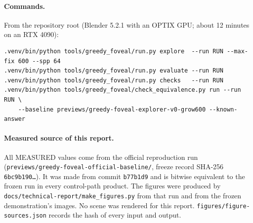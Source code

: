 \documentclass[11pt,a4paper]{article}
\newcommand{\code}[1]{\texttt{\small #1}}
\begin{document}
\paragraph{Commands.} From the repository root (Blender 5.2.1 with an OPTIX GPU; about 12 minutes on an RTX 4090):
{\footnotesize
\begin{verbatim}
.venv/bin/python tools/greedy_foveal/run.py explore  --run RUN --max-fix 600 --spp 64
.venv/bin/python tools/greedy_foveal/run.py evaluate --run RUN
.venv/bin/python tools/greedy_foveal/run.py checks   --run RUN
.venv/bin/python tools/greedy_foveal/check_equivalence.py run --run RUN \
    --baseline previews/greedy-foveal-explorer-v0-grow600 --known-answer
\end{verbatim}}

\paragraph{Measured source of this report.} All MEASURED values come from the official reproduction run
(\nolinkurl{previews/greedy-foveal-official-baseline/}, freeze record SHA-256 \code{6bc9b190\ldots}). It was made from
commit \code{b77b1d9} and is bitwise equivalent to the frozen run in every control-path product. The figures were
produced by \nolinkurl{docs/technical-report/make_figures.py} from that run and from the frozen demonstration's images.
No scene was rendered for this report. \nolinkurl{figures/figure-sources.json} records the hash of every input and output.
\end{document}
